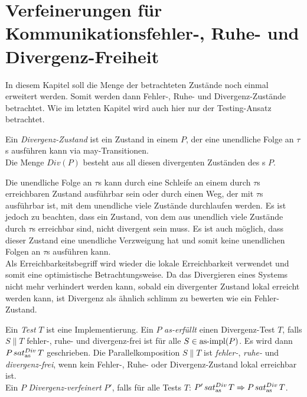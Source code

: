\chapter{Verfeinerungen für Kommunikationsfehler-, Ruhe- und Divergenz-Freiheit}

In diesem Kapitel soll die Menge der betrachteten Zustände noch einmal
erweitert werden. Somit werden dann Fehler-, Ruhe- und Divergenz-Zustände
betrachtet. Wie im letzten Kapitel wird auch hier nur der Testing-Ansatz
betrachtet.

\begin{Def}[Divergenz]
  Ein \emph{Divergenz-Zustand} ist ein Zustand in einem \MEIO{} $P$, der eine
  unendliche Folge an $\tau$s ausführen kann via may-Transitionen.\\
  Die Menge $Div(P)$ besteht aus all diesen divergenten Zuständen des \MEIO{}s
  $P$.
\end{Def}

Die unendliche Folge an $\tau$s kann durch eine Schleife an einem durch $\tau$s
erreichbaren Zustand ausführbar sein oder durch einen Weg, der mit $\tau$s
ausführbar ist, mit dem unendliche viele Zustände durchlaufen werden. Es ist
jedoch zu beachten, dass ein Zustand, von dem aus unendlich viele Zustände
durch $\tau$s  erreichbar sind, nicht divergent sein muss. Es ist auch möglich,
dass dieser Zustand eine unendliche Verzweigung hat und somit keine unendlichen
Folgen an $\tau$s ausführen kann.\\
Als Erreichbarkeitsbegriff wird wieder die lokale Erreichbarkeit verwendet und
somit eine optimistische Betrachtungsweise. Da das Divergieren eines Systems
nicht mehr verhindert werden kann, sobald ein divergenter Zustand lokal
erreicht werden kann, ist Divergenz als ähnlich \glqq schlimm\grqq{} zu
bewerten wie ein Fehler-Zustand.

\begin{Def}
  \label{DivTestDef}
  Ein \emph{Test} $T$ ist eine Implementierung. Ein \MEIO{} $P$
  \emph{as-erfüllt} einen Divergenz-Test $T$, falls $S\|T$ fehler-, ruhe- und
  divergenz-frei ist für alle $S\in \mathrm{as}\text{-}\mathrm{impl} (P)$. Es wird dann $P\hspace{0.05cm}sat_\mathrm{as}^{Div}\hspace{0.05cm} T$
  geschrieben. Die Parallelkomposition $S\|T$ ist \emph{fehler-}, \emph{ruhe-}
  und \emph{divergenz-frei}, wenn kein Fehler-, Ruhe- oder Divergenz-Zustand
  lokal erreichbar ist.\\
  Ein \MEIO{} $P$ \emph{Divergenz-verfeinert} $P'$, falls für alle Tests $T$:
  $P'\hspace{0.05cm}sat_\mathrm{as}^{Div}\hspace{0.05cm} T \Rightarrow P\hspace{0.05cm}sat_\mathrm{as}^{Div}\hspace{0.05cm} T$.
\end{Def}

